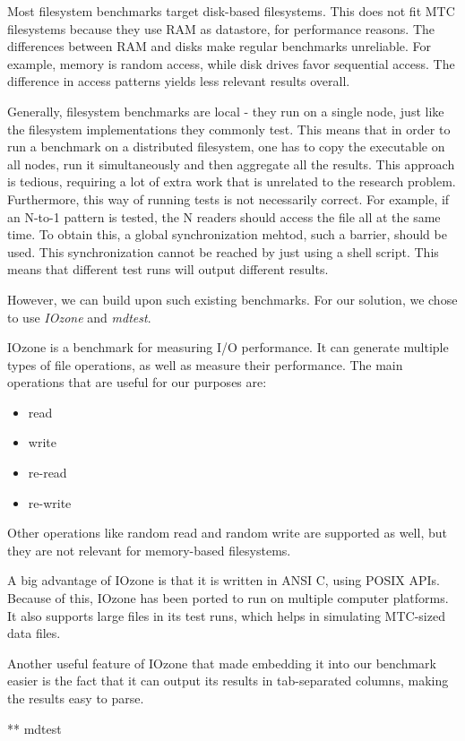 Most filesystem benchmarks target disk-based filesystems. This does not fit MTC filesystems because they use RAM as datastore, for performance reasons. The differences between RAM and disks make regular benchmarks unreliable. For example, memory is random access, while disk drives favor sequential access. The difference in access patterns yields less relevant results overall.

Generally, filesystem benchmarks are local - they run on a single node, just like the filesystem implementations they commonly test. This means that in order to run a benchmark on a distributed filesystem, one has to copy the executable on all nodes, run it simultaneously and then aggregate all the results. This approach is tedious, requiring a lot of extra work that is unrelated to the research problem. Furthermore, this way of running tests is not necessarily correct. For example, if an N-to-1 pattern is tested, the N readers should access the file all at the same time. To obtain this, a global synchronization mehtod, such a barrier, should be used. This synchronization cannot be reached by just using a shell script. This means that different test runs will output different results.

However, we can build upon such existing benchmarks. For our solution, we chose to use \textit{IOzone}\cite{iozone} and \textit{mdtest}\cite{mdtest}.


IOzone is a benchmark for measuring I/O performance. It can generate multiple types of file operations, as well as measure their performance. The main operations that are useful for our purposes are:

\begin{itemize}
\item read
\item write
\item re-read
\item re-write
\end{itemize}

Other operations like random read and random write are supported as well, but they are not relevant for memory-based filesystems.

A big advantage of IOzone is that it is written in ANSI C, using POSIX APIs. Because of this, IOzone has been ported to run on multiple computer platforms. It also supports large files in its test runs, which helps in simulating MTC-sized data files.

Another useful feature of IOzone that made embedding it into our benchmark easier is the fact that it can output its results in tab-separated columns, making the results easy to parse.

** mdtest